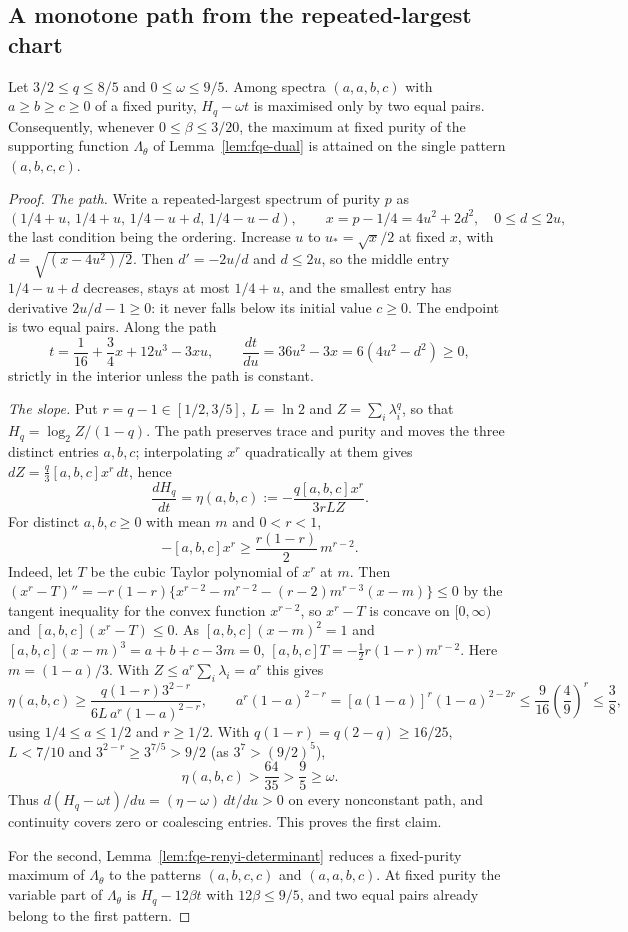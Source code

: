 \subsection{A monotone path from the repeated-largest chart}
\label{sec:fqe-low-tilt-reduction}
\begin{lemma}\label{lem:fqe-low-tilt-reduction}
Let $3/2\le q\le8/5$ and $0\le\omega\le9/5$.
Among spectra $(a,a,b,c)$ with $a\ge b\ge c\ge0$ of a fixed purity,
$H_q-\omega t$ is maximised only by two equal pairs.
Consequently, whenever $0\le\beta\le3/20$, the maximum at fixed purity of the supporting function
$\Lambda_\theta$ of Lemma~\ref{lem:fqe-dual} is attained on the single pattern $(a,b,c,c)$.
\end{lemma}
\begin{proof}
\emph{The path.} Write a repeated-largest spectrum of purity $p$ as
\[
 (1/4+u,\,1/4+u,\,1/4-u+d,\,1/4-u-d),\qquad
 x=p-1/4=4u^2+2d^2,\quad 0\le d\le2u,
\]
the last condition being the ordering. Increase $u$ to $u_*=\sqrt x/2$ at fixed $x$, with
$d=\sqrt{(x-4u^2)/2}$. Then $d'=-2u/d$ and $d\le2u$, so the middle entry $1/4-u+d$ decreases,
stays at most $1/4+u$, and the smallest entry has derivative $2u/d-1\ge0$: it never falls below its
initial value $c\ge0$. The endpoint is two equal pairs. Along the path
\[
 t=\frac1{16}+\frac34x+12u^3-3xu,\qquad
 \frac{dt}{du}=36u^2-3x=6(4u^2-d^2)\ge0,
\]
strictly in the interior unless the path is constant.

\emph{The slope.} Put $r=q-1\in[1/2,3/5]$, $L=\ln2$ and $Z=\sum_i\lambda_i^q$, so that
$H_q=\log_2Z/(1-q)$. The path preserves trace and purity and moves the three distinct entries
$a,b,c$; interpolating $x^r$ quadratically at them gives $dZ=\frac q3[a,b,c]x^r\,dt$, hence
\[
 \frac{dH_q}{dt}=\eta(a,b,c):=-\frac{q[a,b,c]x^r}{3rLZ}.
\]
For distinct $a,b,c\ge0$ with mean $m$ and $0<r<1$,
\[
 -[a,b,c]x^r\ge\frac{r(1-r)}2\,m^{r-2}.
 \tag{DD}\label{eq:fqe-dd-power}
\]
Indeed, let $T$ be the cubic Taylor polynomial of $x^r$ at $m$. Then
$(x^r-T)''=-r(1-r)\{x^{r-2}-m^{r-2}-(r-2)m^{r-3}(x-m)\}\le0$ by the tangent inequality for the convex
function $x^{r-2}$, so $x^r-T$ is concave on $[0,\infty)$ and $[a,b,c](x^r-T)\le0$. As
$[a,b,c](x-m)^2=1$ and $[a,b,c](x-m)^3=a+b+c-3m=0$, $[a,b,c]T=-\frac12r(1-r)m^{r-2}$.
Here $m=(1-a)/3$. With $Z\le a^r\sum_i\lambda_i=a^r$ this gives
\[
 \eta(a,b,c)\ge\frac{q(1-r)3^{2-r}}{6L\,a^r(1-a)^{2-r}},\qquad
 a^r(1-a)^{2-r}=[a(1-a)]^r(1-a)^{2-2r}\le\frac9{16}\left(\frac49\right)^r\le\frac38,
\]
using $1/4\le a\le1/2$ and $r\ge1/2$. With $q(1-r)=q(2-q)\ge16/25$, $L<7/10$ and
$3^{2-r}\ge3^{7/5}>9/2$ (as $3^7>(9/2)^5$),
\[
 \eta(a,b,c)>\frac{64}{35}>\frac95\ge\omega.
\tag{LT}\label{eq:fqe-low-tilt-slope}
\]
Thus $d(H_q-\omega t)/du=(\eta-\omega)\,dt/du>0$ on every nonconstant path, and continuity covers zero or
coalescing entries. This proves the first claim.

For the second, Lemma~\ref{lem:fqe-renyi-determinant} reduces a fixed-purity maximum of $\Lambda_\theta$ to the
patterns $(a,b,c,c)$ and $(a,a,b,c)$. At fixed purity the variable part of $\Lambda_\theta$ is $H_q-12\beta t$ with
$12\beta\le9/5$, and two equal pairs already belong to the first pattern.
\end{proof}
